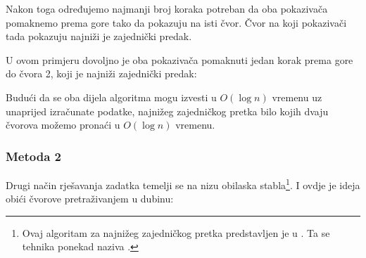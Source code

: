 Nakon toga određujemo najmanji broj koraka
potreban da oba pokazivača pomaknemo prema gore tako da
pokazuju na isti čvor.
Čvor na koji pokazivači tada pokazuju
najniži je zajednički predak.

U ovom primjeru dovoljno je oba pokazivača pomaknuti
jedan korak prema gore do čvora 2,
koji je najniži zajednički predak:

\begin{center}
\end{center}

Budući da se oba dijela algoritma mogu izvesti u
$O(\log n)$ vremenu uz unaprijed izračunate podatke,
najnižeg zajedničkog pretka bilo kojih dvaju
čvorova možemo pronaći u $O(\log n)$ vremenu.

\subsubsection{Metoda 2}

Drugi način rješavanja zadatka temelji se na
nizu obilaska stabla\footnote{Ovaj algoritam za najnižeg zajedničkog pretka predstavljen je u \cite{ben00}.
Ta se tehnika ponekad naziva 
 \cite{tar84}.}.
I ovdje je ideja obići čvorove
pretraživanjem u dubinu:

